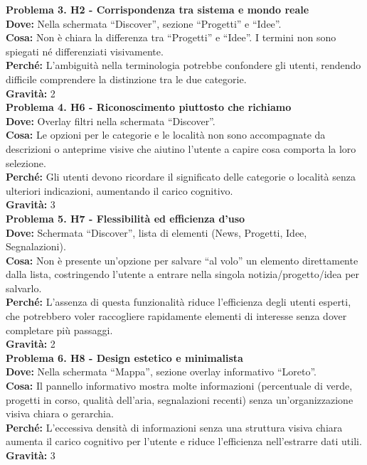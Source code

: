 \documentclass[a4paper,12pt]{article}
\begin{document}
\textbf{Problema 3. H2 - Corrispondenza tra sistema e mondo reale} \\
\textbf{Dove:} Nella schermata “Discover”, sezione “Progetti” e “Idee”. \\
\textbf{Cosa:} Non è chiara la differenza tra “Progetti” e “Idee”. I termini non sono spiegati né differenziati visivamente. \\
\textbf{Perché:} L’ambiguità nella terminologia potrebbe confondere gli utenti, rendendo difficile comprendere la distinzione tra le due categorie. \\
\textbf{Gravità:} 2 \\[1em]

\textbf{Problema 4. H6 - Riconoscimento piuttosto che richiamo} \\
\textbf{Dove:} Overlay filtri nella schermata “Discover”. \\
\textbf{Cosa:} Le opzioni per le categorie e le località non sono accompagnate da descrizioni o anteprime visive che aiutino l’utente a capire cosa comporta la loro selezione. \\
\textbf{Perché:} Gli utenti devono ricordare il significato delle categorie o località senza ulteriori indicazioni, aumentando il carico cognitivo. \\
\textbf{Gravità:} 3 \\[1em]

\textbf{Problema 5. H7 - Flessibilità ed efficienza d’uso} \\
\textbf{Dove:} Schermata “Discover”, lista di elementi (News, Progetti, Idee, Segnalazioni). \\
\textbf{Cosa:} Non è presente un’opzione per salvare “al volo” un elemento direttamente dalla lista, costringendo l’utente a entrare nella singola notizia/progetto/idea per salvarlo. \\
\textbf{Perché:} L’assenza di questa funzionalità riduce l’efficienza degli utenti esperti, che potrebbero voler raccogliere rapidamente elementi di interesse senza dover completare più passaggi. \\
\textbf{Gravità:} 2 \\[1em]

\textbf{Problema 6. H8 - Design estetico e minimalista} \\
\textbf{Dove:} Nella schermata “Mappa”, sezione overlay informativo “Loreto”. \\
\textbf{Cosa:} Il pannello informativo mostra molte informazioni (percentuale di verde, progetti in corso, qualità dell’aria, segnalazioni recenti) senza un’organizzazione visiva chiara o gerarchia. \\
\textbf{Perché:} L’eccessiva densità di informazioni senza una struttura visiva chiara aumenta il carico cognitivo per l’utente e riduce l’efficienza nell’estrarre dati utili. \\
\textbf{Gravità:} 3 \\[1em]
\end{document}
